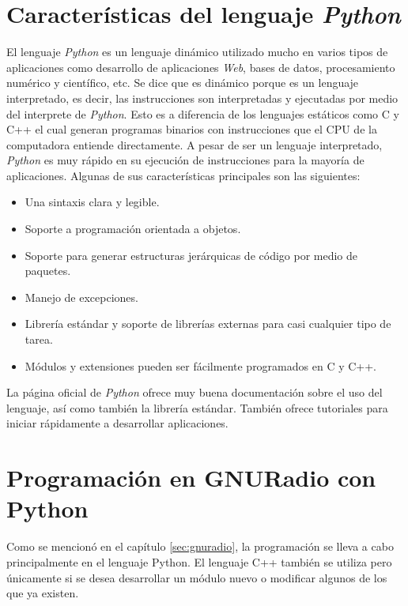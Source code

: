 \section{Caracter\'isticas del lenguaje \emph{Python}}
El lenguaje \emph{Python} es un lenguaje din\'amico utilizado mucho en varios tipos de aplicaciones como desarrollo de
aplicaciones \emph{Web}, bases de datos, procesamiento num\'erico y cient\'ifico, etc. Se dice que es din\'amico porque es un
lenguaje interpretado, es decir, las instrucciones son interpretadas y ejecutadas por medio del interprete de \emph{Python}. Esto es a diferencia de los
lenguajes est\'aticos como C y C++ el cual generan programas binarios con instrucciones que el CPU de la computadora entiende
directamente. A pesar de ser un lenguaje interpretado, \emph{Python} es muy r\'apido en su ejecuci\'on de instrucciones para la
mayor\'ia de aplicaciones. Algunas de sus caracter\'isticas principales son las siguientes:

\begin{itemize}
  \item Una sintaxis clara y legible.
  \item Soporte a programaci\'on orientada a objetos.
  \item Soporte para generar estructuras jer\'arquicas de c\'odigo por medio de paquetes.
  \item Manejo de excepciones.
  \item Librer\'ia est\'andar y soporte de librer\'ias externas para casi cualquier tipo de tarea.
  \item M\'odulos y extensiones pueden ser f\'acilmente programados en C y C++.
\end{itemize}

La p\'agina oficial de \emph{Python} ofrece muy buena documentaci\'on sobre el uso del lenguaje, as\'i como tambi\'en la
librer\'ia est\'andar. Tambi\'en ofrece tutoriales para iniciar r\'apidamente a desarrollar aplicaciones.

\section{Programaci\'on en GNURadio con Python}

Como se mencion\'o en el cap\'itulo \ref{sec:gnuradio}, la programaci\'on se lleva a
cabo principalmente en el lenguaje Python. El lenguaje C++ tambi\'en se utiliza
pero \'unicamente si se desea desarrollar un m\'odulo nuevo o modificar algunos de
los que ya existen.

